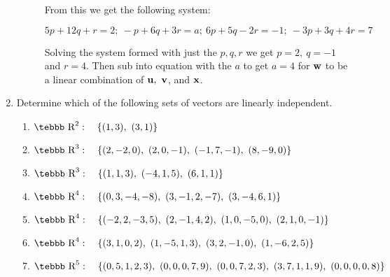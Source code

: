 \begin{enumerate}
\begin{description}
From this we get the following system:

$5p+12q+r=2;\ -p+6q+3r=a;\ 6p+5q-2r=-1;\ -3p+3q+4r=7$

Solving the system formed with just the $p,q,r$ we get $p=2,\
q=-1$ and $r=4$. Then sub into equation with the $a$ to get $a=4$
for ${\bf w}$ to be a linear combination of ${\bf u},\ {\bf v}$,
and ${\bf x}$.
\end{description}
\item Determine which of the following sets of vectors are
linearly independent.
\begin{enumerate}
\item $\mbox{\tebbb R}^2: \quad \{(1,3),\ (3,1)\}$
\item $\mbox{\tebbb R}^3: \quad \{(2,-2,0),\  (2,0,-1),\ (-1,7,-1),\ (8,-9,0)\}$
\item $\mbox{\tebbb R}^3: \quad \{(1,1,3),\ (-4,1,5),\ (6,1,1)\}$
\item $\mbox{\tebbb R}^4: \quad \{(0,3,-4,-8),\ (3,-1,2,-7),\ (3,-4,6,1)\}$
\item $\mbox{\tebbb R}^4: \quad \{ (-2,2,-3,5),\ (2,-1,4,2),\ (1,0,-5,0),\ (2,1,0,-1) \}$
\item $\mbox{\tebbb R}^4: \quad \{ (3,1,0,2),\ (1,-5,1,3),\ (3,2,-1,0),\ (1,-6,2,5)\}$
\item $\mbox{\tebbb R}^5: \quad \{(0,5,1,2,3),\ (0,0,0,7,9),\ (0,0,7,2,3), \ (3,7,1,1,9),\ (0,0,0,0,8) \}$
\end{enumerate}


\end{enumerate}
